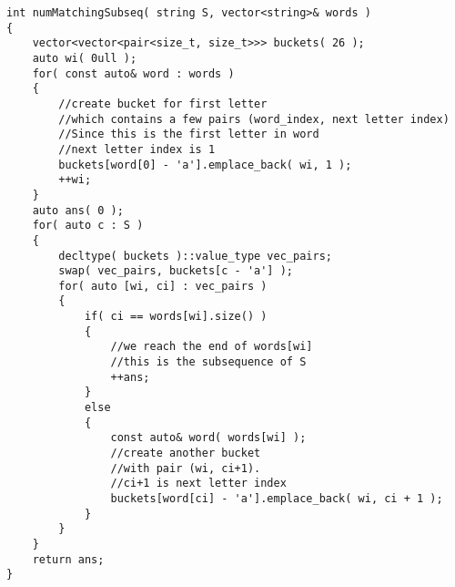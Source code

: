 \setcounter{lstlisting}{0}
\begin{lstlisting}[style=customc, caption={Next Letter Position}]
int numMatchingSubseq( string S, vector<string>& words )
{
    vector<vector<pair<size_t, size_t>>> buckets( 26 );
    auto wi( 0ull );
    for( const auto& word : words )
    {
        //create bucket for first letter
        //which contains a few pairs (word_index, next letter index)
        //Since this is the first letter in word
        //next letter index is 1
        buckets[word[0] - 'a'].emplace_back( wi, 1 );
        ++wi;
    }
    auto ans( 0 );
    for( auto c : S )
    {
        decltype( buckets )::value_type vec_pairs;
        swap( vec_pairs, buckets[c - 'a'] );
        for( auto [wi, ci] : vec_pairs )
        {
            if( ci == words[wi].size() )
            {
                //we reach the end of words[wi]
                //this is the subsequence of S
                ++ans;
            }
            else
            {
                const auto& word( words[wi] );
                //create another bucket
                //with pair (wi, ci+1).
                //ci+1 is next letter index
                buckets[word[ci] - 'a'].emplace_back( wi, ci + 1 );
            }
        }
    }
    return ans;
}
\end{lstlisting}